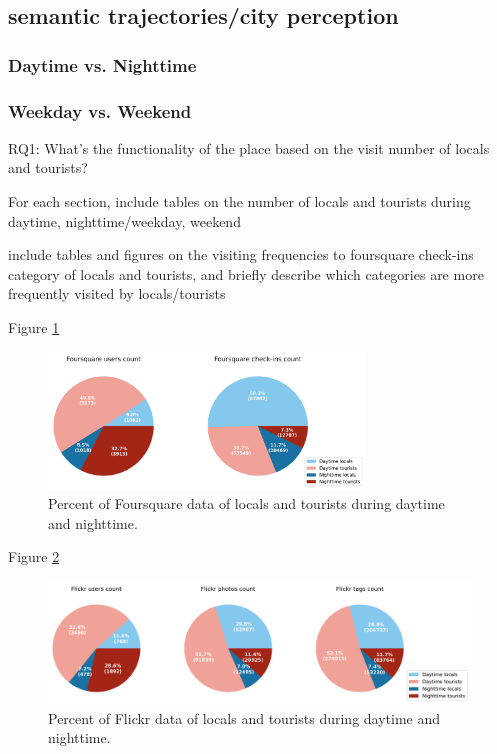 \documentclass{article}
\begin{document}
\subsection{semantic trajectories/city perception}
\subsubsection{Daytime vs. Nighttime}
\subsubsection{Weekday vs. Weekend}

RQ1: What’s the functionality of the place based on the visit number of locals and tourists?

For each section,
include tables on the number of locals and tourists during daytime, nighttime/weekday, weekend

include tables and figures on the visiting frequencies to foursquare check-ins category of locals and tourists, and briefly describe which categories are more frequently visited by locals/tourists


Figure \ref{fig:foursquare_day_count_pie}
\begin{figure}
\centering
\includegraphics[width=0.75\textwidth]{figures/foursquare_day_count_pie.png}
\caption{\label{fig:foursquare_day_count_pie}Percent of Foursquare data of locals and tourists during daytime and nighttime.}
\end{figure}

Figure \ref{fig:flickr_day_count_pie}
\begin{figure}
\centering
\includegraphics[width=1.13\textwidth]{figures/flickr_day_count_pie.png}
\caption{\label{fig:flickr_day_count_pie}Percent of Flickr data of locals and tourists during daytime and nighttime.}
\end{figure}
\end{document}
